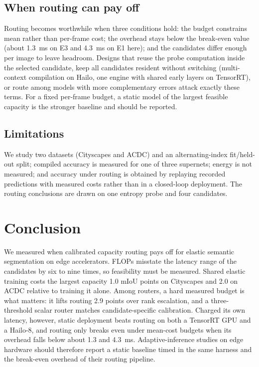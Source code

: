 \documentclass[a4paper,5p]{elsarticle}
\newcommand{\miou}{mIoU}
\begin{document}
\subsection{When routing can pay off}

Routing becomes worthwhile when three conditions hold: the budget constrains mean rather than per-frame cost; the overhead stays below the break-even value (about 1.3~ms on E3 and 4.3~ms on E1 here); and the candidates differ enough per image to leave headroom. Designs that reuse the probe computation inside the selected candidate, keep all candidates resident without switching (multi-context compilation on Hailo, one engine with shared early layers on TensorRT), or route among models with more complementary errors attack exactly these terms. For a fixed per-frame budget, a static model of the largest feasible capacity is the stronger baseline and should be reported.

\subsection{Limitations}

We study two datasets (Cityscapes and ACDC) and an alternating-index fit/held-out split; compiled accuracy is measured for one of three supernets; energy is not measured; and accuracy under routing is obtained by replaying recorded predictions with measured costs rather than in a closed-loop deployment. The routing conclusions are drawn on one entropy probe and four candidates.

\section{Conclusion}
\label{sec:conclusion}

We measured when calibrated capacity routing pays off for elastic semantic segmentation on edge accelerators. FLOPs misstate the latency range of the candidates by six to nine times, so feasibility must be measured. Shared elastic training costs the largest capacity 1.0 \miou{} points on Cityscapes and 2.0 on ACDC relative to training it alone. Among routers, a hard measured budget is what matters: it lifts routing 2.9 points over rank escalation, and a three-threshold scalar router matches candidate-specific calibration. Charged its own latency, however, static deployment beats routing on both a TensorRT GPU and a Hailo-8, and routing only breaks even under mean-cost budgets when its overhead falls below about 1.3 and 4.3~ms. Adaptive-inference studies on edge hardware should therefore report a static baseline timed in the same harness and the break-even overhead of their routing pipeline.
\end{document}
